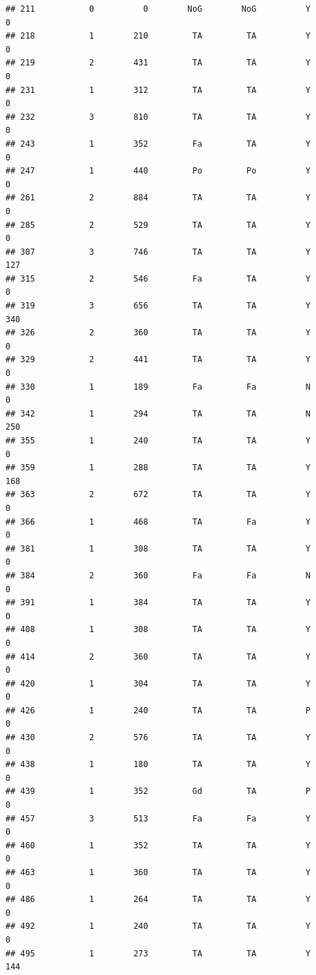 \documentclass[]{article}
\begin{document}
\begin{verbatim}
## 211           0          0        NoG        NoG          Y          0
## 218           1        210         TA         TA          Y          0
## 219           2        431         TA         TA          Y          0
## 231           1        312         TA         TA          Y          0
## 232           3        810         TA         TA          Y          0
## 243           1        352         Fa         TA          Y          0
## 247           1        440         Po         Po          Y          0
## 261           2        884         TA         TA          Y          0
## 285           2        529         TA         TA          Y          0
## 307           3        746         TA         TA          Y        127
## 315           2        546         Fa         TA          Y          0
## 319           3        656         TA         TA          Y        340
## 326           2        360         TA         TA          Y          0
## 329           2        441         TA         TA          Y          0
## 330           1        189         Fa         Fa          N          0
## 342           1        294         TA         TA          N        250
## 355           1        240         TA         TA          Y          0
## 359           1        288         TA         TA          Y        168
## 363           2        672         TA         TA          Y          0
## 366           1        468         TA         Fa          Y          0
## 381           1        308         TA         TA          Y          0
## 384           2        360         Fa         Fa          N          0
## 391           1        384         TA         TA          Y          0
## 408           1        308         TA         TA          Y          0
## 414           2        360         TA         TA          Y          0
## 420           1        304         TA         TA          Y          0
## 426           1        240         TA         TA          P          0
## 430           2        576         TA         TA          Y          0
## 438           1        180         TA         TA          Y          0
## 439           1        352         Gd         TA          P          0
## 457           3        513         Fa         Fa          Y          0
## 460           1        352         TA         TA          Y          0
## 463           1        360         TA         TA          Y          0
## 486           1        264         TA         TA          Y          0
## 492           1        240         TA         TA          Y          0
## 495           1        273         TA         TA          Y        144

\end{verbatim}
\end{document}
